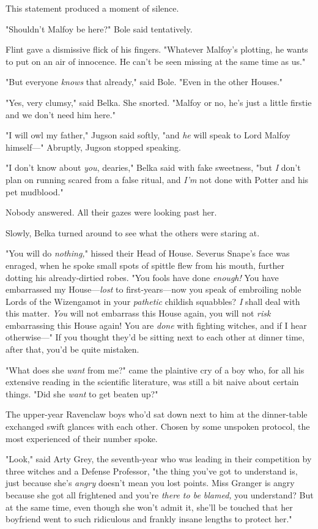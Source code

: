 This statement produced a moment of silence.

"Shouldn't Malfoy be here?" Bole said tentatively.

Flint gave a dismissive flick of his fingers. "Whatever Malfoy's plotting, he
wants to put on an air of innocence. He can't be seen missing at the same time
as us."

"But everyone \emph{knows} that already," said Bole. "Even in the other Houses."

"Yes, very clumsy," said Belka. She snorted. "Malfoy or no, he's just a little
firstie and we don't need him here."

"I will owl my father," Jugson said softly, "and \emph{he} will speak to Lord
Malfoy himself---" Abruptly, Jugson stopped speaking.

"I don't know about \emph{you}, dearies," Belka said with fake sweetness, "but
\emph{I} don't plan on running scared from a false ritual, and \emph{I'm} not
done with Potter and his pet mudblood."

Nobody answered. All their gazes were looking past her.

Slowly, Belka turned around to see what the others were staring at.

"You will do \emph{nothing,}" hissed their Head of House. Severus Snape's face
was enraged, when he spoke small spots of spittle flew from his mouth, further
dotting his already-dirtied robes. "You fools have done \emph{enough!} You have
embarrassed my House---\emph{lost} to first-years---now you speak of embroiling
noble Lords of the Wizengamot in your \emph{pathetic} childish squabbles?
\emph{I} shall deal with this matter. \emph{You} will not embarrass this House
again, you will not \emph{risk} embarrassing this House again! You are
\emph{done} with fighting witches, and if I hear otherwise---"
\later
If you thought they'd be sitting next to each other at dinner time, after that,
you'd be quite mistaken.

"What does she \emph{want} from me?" came the plaintive cry of a boy who, for
all his extensive reading in the scientific literature, was still a bit naive
about certain things. "Did she \emph{want} to get beaten up?"

The upper-year Ravenclaw boys who'd sat down next to him at the dinner-table
exchanged swift glances with each other. Chosen by some unspoken protocol, the
most experienced of their number spoke.

"Look," said Arty Grey, the seventh-year who was leading in their competition
by three witches and a Defense Professor, "the thing you've got to understand
is, just because she's \emph{angry} doesn't mean you lost points. Miss Granger
is angry because she got all frightened and you're \emph{there to be blamed,}
you understand? But at the same time, even though she won't admit it, she'll be
touched that her boyfriend went to such ridiculous and frankly insane lengths
to protect her."

